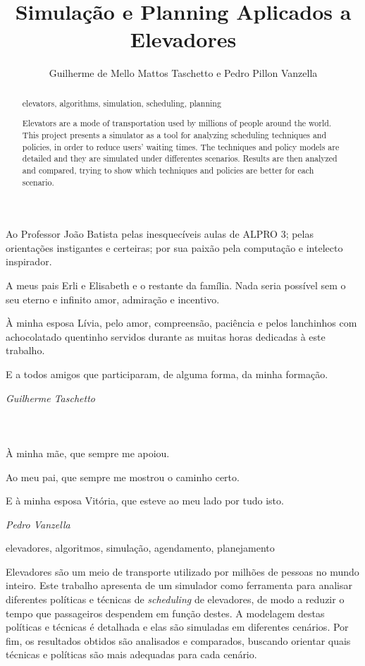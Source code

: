 \documentclass[portuguese,oneside]{tcc}
\author{Guilherme de Mello Mattos Taschetto e Pedro Pillon Vanzella}
\title{Simulação e Planning Aplicados a Elevadores}
      {Simulation and Planning Applied to Elevators}
\begin{document}

\begin{agradecimentos}

Ao Professor João Batista pelas inesquecíveis aulas de ALPRO 3; pelas
orientações instigantes e certeiras; por sua paixão pela computação e intelecto
inspirador.

A meus pais Erli e Elisabeth e o restante da família. Nada seria possível sem o
seu eterno e infinito amor, admiração e incentivo.

À minha esposa Lívia, pelo amor, compreensão, paciência e pelos lanchinhos com
achocolatado quentinho servidos durante as muitas horas dedicadas à este trabalho.

E a todos amigos que participaram, de alguma forma, da minha formação.

\hfill \textit{Guilherme Taschetto} \\ \\ \\ \\

À minha mãe, que sempre me apoiou.

Ao meu pai, que sempre me mostrou o caminho certo.

E à minha esposa Vitória, que esteve ao meu lado por tudo isto.

\hfill \textit{Pedro Vanzella}
\end{agradecimentos}

\begin{resumo}{elevadores, algoritmos, simulação, agendamento, planejamento}

Elevadores são um meio de transporte utilizado por milhões de pessoas no mundo
inteiro. Este trabalho apresenta de um simulador como ferramenta para analisar
diferentes políticas e técnicas de \textit{scheduling} de elevadores, de modo a
reduzir o tempo que passageiros despendem em função destes. A modelagem destas
políticas e técnicas é detalhada e elas são simuladas em diferentes cenários.
Por fim, os resultados obtidos são analisados e comparados, buscando orientar
quais técnicas e políticas são mais adequadas para cada cenário.

\end{resumo}

\begin{abstract}{elevators, algorithms, simulation, scheduling, planning}

Elevators are a mode of transportation used by millions of people around the
world. This project presents a simulator as a tool for analyzing  scheduling
techniques and policies, in order to reduce users' waiting times. The techniques
and policy models are detailed and they are simulated under differentes
scenarios. Results are then analyzed and compared, trying to show which
techniques and policies are better for each scenario.

\end{abstract}
\end{document}
